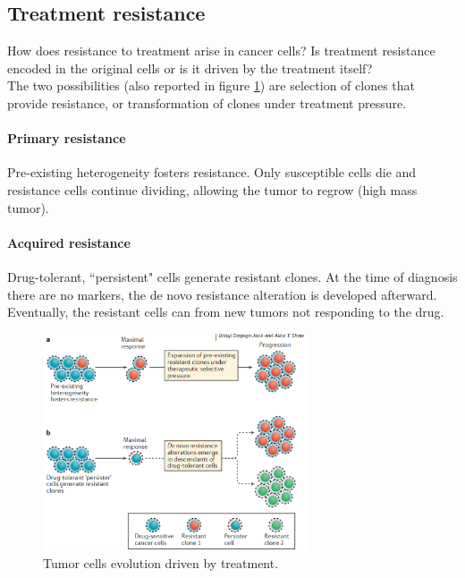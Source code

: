 \subsection{Treatment resistance}
How does resistance to treatment arise in cancer cells? Is treatment resistance encoded in the original cells or is it driven by the treatment itself?
\\
The two possibilities (also reported in figure \ref{fig:response}) are selection of clones that provide resistance, or transformation of clones under treatment pressure.

\paragraph*{Primary resistance}
Pre-existing heterogeneity fosters resistance. Only susceptible cells die and resistance cells continue dividing, allowing the tumor to regrow (high mass tumor).

\paragraph*{Acquired resistance}
Drug-tolerant, “persistent" cells generate resistant clones. At the time of diagnosis there are no markers, the de novo resistance alteration is developed afterward. Eventually, the resistant cells can from new tumors not responding to the drug.


\begin{figure}[H]
	\centering
	\includegraphics[width=0.7\textwidth]{response.png}
	\caption{ Tumor cells evolution driven by treatment.}
	\label{fig:response}
\end{figure}

